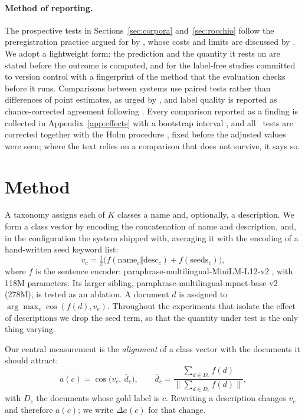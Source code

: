 \documentclass[11pt]{article}
\begin{document}
\paragraph{Method of reporting.}
The prospective tests in Sections~\ref{sec:corpora} and~\ref{sec:rocchio} follow
the preregistration practice argued for by
\citet{van-miltenburg-etal-2021-preregistering}, whose costs and limits are
discussed by \citet{sogaard-etal-2023-two}. We adopt a lightweight form: the
prediction and the quantity it rests on are stated before the outcome is
computed, and for the label-free studies committed to version control with a
fingerprint of the method that the evaluation checks before it runs.
Comparisons between systems use paired tests rather than differences of point
estimates, as urged by \citet{dror-etal-2018-hitchhikers}, and label quality is
reported as chance-corrected agreement following \citet{artstein-poesio-2008-survey}. Every comparison
reported as a finding is collected in Appendix~\ref{app:effects} with a bootstrap
interval \citep{efron-1979-bootstrap}, and all \EffectTests\ tests are corrected
together with the Holm procedure \citep{holm-1979-simple}, fixed before the
adjusted values were seen; where the text relies on a comparison that does not
survive, it says so.

\section{Method}

A taxonomy assigns each of $K$ classes a name and, optionally, a description.
We form a class vector by encoding the concatenation of name and description,
and, in the configuration the system shipped with, averaging it with the
encoding of a hand-written seed keyword list:
\[
  v_c = \tfrac{1}{2}\big(f(\text{name}_c \Vert \text{desc}_c) + f(\text{seeds}_c)\big),
\]
where $f$ is the sentence encoder: paraphrase-\allowbreak multilingual-\allowbreak MiniLM-\allowbreak L12-\allowbreak v2
\citep{reimers-gurevych-2020-making}, with 118M parameters. Its larger sibling,
paraphrase-\allowbreak multilingual-\allowbreak mpnet-\allowbreak base-\allowbreak v2 (278M), is tested as an ablation.
A document $d$ is assigned to
$\arg\max_c \cos(f(d), v_c)$. Throughout the experiments that isolate the effect
of descriptions we drop the seed term, so that the quantity under test is the
only thing varying.

Our central measurement is the \emph{alignment} of a class vector with the
documents it should attract:
\[
  a(c) = \cos\!\big(v_c,\ \bar{d}_c\big),\qquad
  \bar{d}_c = \frac{\sum_{d \in D_c} f(d)}{\lVert \sum_{d \in D_c} f(d)\rVert},
\]
with $D_c$ the documents whose gold label is $c$. Rewriting a description
changes $v_c$ and therefore $a(c)$; we write $\Delta a(c)$ for that change.
\end{document}
